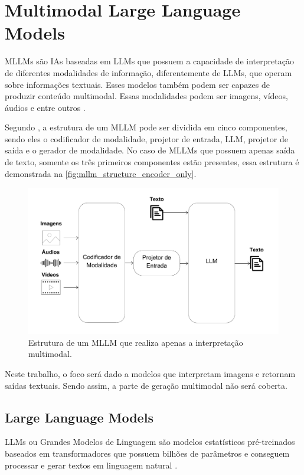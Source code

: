 \section{Multimodal Large Language Models}

\acp{MLLM} são \acp{IA} baseadas em \acp{LLM} que possuem a capacidade de interpretação de diferentes modalidades de informação, diferentemente de \acp{LLM}, que
operam sobre informações textuais. Esses modelos também podem ser capazes de produzir conteúdo multimodal. Essas modalidades podem ser imagens, vídeos, áudios e
entre outros \cite{mllm_survey_2023, mllm_survey_2024}.

Segundo \textcite{mllm_survey_2024}, a estrutura de um \ac{MLLM} pode ser dividida em cinco componentes, sendo eles o codificador de modalidade, projetor de entrada,
\ac{LLM}, projetor de saída e o gerador de modalidade. No caso de \acp{MLLM} que possuem apenas saída de texto, somente os três primeiros componentes estão presentes,
essa estrutura é demonstrada na \autoref{fig:mllm_structure_encoder_only}.

\begin{figure}[ht]
      \centering
      \includegraphics[width=0.7\columnwidth,keepaspectratio]{images/mllm_structure_encoder_only.pdf}
      \caption{\small Estrutura de um \ac{MLLM} que realiza apenas a interpretação multimodal.}
      \label{fig:mllm_structure_encoder_only}
\end{figure}

Neste trabalho, o foco será dado a modelos que interpretam imagens e retornam saídas textuais. Sendo assim, a parte de geração multimodal não será coberta.

\subsection{Large Language Models}

\acp{LLM} ou Grandes Modelos de Linguagem são modelos estatísticos pré-treinados baseados em transformadores que possuem bilhões de parâmetros e conseguem processar e
gerar textos em linguagem natural \cite{llm_survey_2024}.

